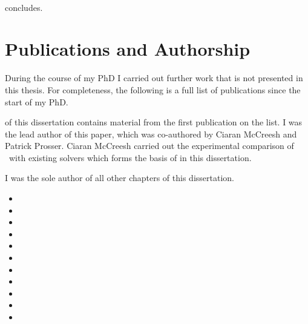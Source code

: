 \paragraph*{} concludes.

\section{Publications and Authorship}

During the course of my PhD I carried out further work
that is not presented in this thesis.
For completeness, the following is a full list of publications
since the start of my PhD.

 of this dissertation contains material from the
first publication on the list.  I was the lead author of this paper, which was
co-authored by Ciaran McCreesh and Patrick Prosser.
Ciaran McCreesh carried out the experimental comparison of \McSplit\ with
existing solvers which forms the basis of  in
this dissertation.

I was the sole author of all other chapters of this dissertation.

\begin{itemize}
    \item{}
    \item{}
    \item{}
    \item{}
    \item{}
    \item{}
    \item{}
    \item{}
    \item{}
    \item{}
    \item{}
\end{itemize}

